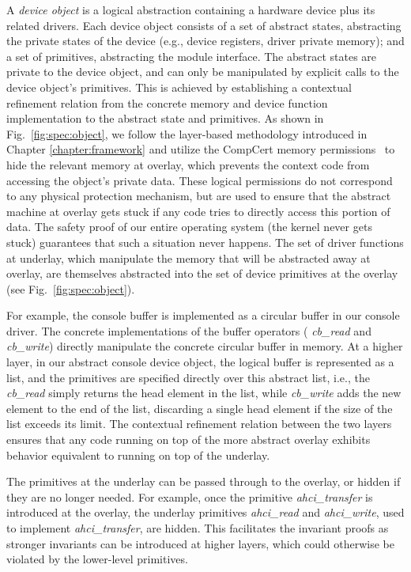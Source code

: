 A {\it device object} is a logical abstraction containing a hardware device plus
its related drivers. Each device object consists of a set of abstract states,
abstracting the private states of the device (e.g., device registers, driver
private memory); and a set of primitives, abstracting the module interface. The
abstract states are private to the device object, and can only be manipulated by
explicit calls to the device object's primitives. This is achieved by
establishing a contextual refinement relation from the concrete memory and
device function implementation to the abstract state and primitives. As shown in
Fig.~\ref{fig:spec:object}, we follow the layer-based methodology introduced in
Chapter \ref{chapter:framework}
and utilize the CompCert memory permissions~\cite{leroy08} to hide the relevant
memory at overlay, which prevents the context code from accessing the object's
private data. These logical permissions do not correspond to any physical
protection mechanism, but are used to ensure that the abstract machine at
overlay gets stuck if any code tries to directly access this portion of data.
The safety proof of our entire operating system (the kernel never gets stuck)
guarantees that such a situation never happens.  The set of driver functions at
underlay, which manipulate the memory that will be abstracted away at overlay,
are themselves abstracted into the set of device primitives at the overlay (see
Fig.~\ref{fig:spec:object}).

For example, the console buffer is implemented as a circular buffer in our
console driver.  The concrete implementations of the buffer operators ({\it
	cb\_read} and {\it cb\_write}) directly manipulate the concrete circular
buffer in memory. At a higher layer, in our abstract console device object, the
logical buffer is represented as a list, and the primitives are specified
directly over this abstract list, i.e., the {\it cb\_read} simply returns the
head element in the list, while {\it cb\_write} adds the new element to the end
of the list, discarding a single head element if the size of the list exceeds
its limit.  The contextual refinement relation between the two layers ensures
that any code running on top of the more abstract overlay exhibits behavior
equivalent to running on top of the underlay.

The primitives at the underlay can be passed through to the overlay, or hidden
if they are no longer needed.  For example, once the primitive {\it
	ahci\_transfer} is introduced at the overlay, the underlay primitives {\it
	ahci\_read} and {\it ahci\_write}, used to implement {\it ahci\_transfer}, are
hidden. This facilitates the invariant proofs as stronger invariants can be
introduced at higher layers, which could otherwise be violated by the
lower-level primitives.

